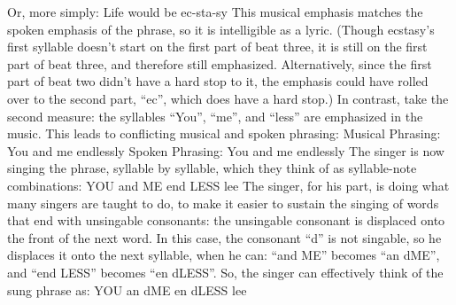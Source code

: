 \documentclass[10pt,oneside]{memoir}
\title{\mytitle}
\author{\myauthor}
\def\mychapterstyle{default}
\def\mypagestyle{headings}
\def\revision{}
\begin{document}
\chapterstyle{\mychapterstyle}
\pagestyle{\mypagestyle}

%
%

\frontmatter



\maketitle
\clearpage

\vspace*{\fill}

\setlength{\parindent}{0pt}

\ifx\mycopyright\undefined
\else
	\textcopyright{} \mycopyright
\fi

\revision

\begin{center}
\end{center}

\setlength{\parindent}{1em}
\clearpage

\tableofcontents


%
%


\setlength{\parindent}{1em}

\mainmatter
Or, more simply:
Life would be ec-sta-sy
This musical emphasis matches the spoken emphasis of the phrase, so it is intelligible as a lyric. (Though ecstasy's first syllable doesn't start on the first part of beat three, it is still on the first part of beat three, and therefore still emphasized. Alternatively, since the first part of beat two didn't have a hard stop to it, the emphasis could have rolled over to the second part, ``ec'', which does have a hard stop.)
In contrast, take the second measure: the syllables ``You'', ``me'', and ``less'' are emphasized in the music. This leads to conflicting musical and spoken phrasing:
Musical Phrasing: You and me endlessly 
Spoken Phrasing: You and me endlessly
The singer is now singing the phrase, syllable by syllable, which they think of as syllable-note combinations:
YOU and ME end LESS lee
The singer, for his part, is doing what many singers are taught to do, to make it easier to sustain the singing of words that end with unsingable consonants: the unsingable consonant is displaced onto the front of the next word. In this case, the consonant ``d'' is not singable, so he displaces it onto the next syllable, when he can: ``and ME'' becomes ``an dME'', and ``end LESS'' becomes ``en dLESS''. So, the singer can effectively think of the sung phrase as:
YOU an dME en dLESS lee
\end{document}
